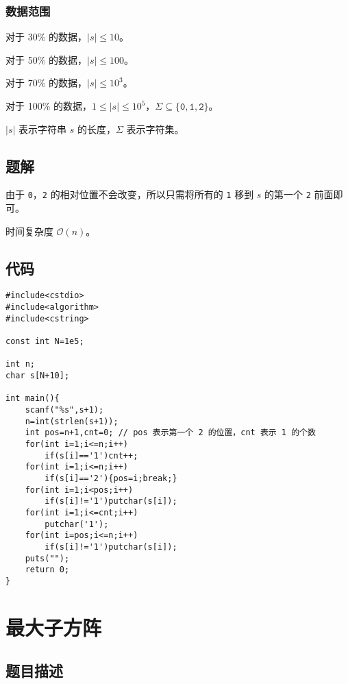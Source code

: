 \documentclass{article}
\begin{document}
	\subsubsection{数据范围}

	对于 30\% 的数据，$|s|\le 10$。

	对于 50\% 的数据，$|s|\le 100$。

	对于 70\% 的数据，$|s|\le 10^{3}$。

	对于 100\% 的数据，$1\le |s|\le 10^{5}$，$\Sigma\subseteq\{\texttt{0},\texttt{1},\texttt{2}\}$。

	$|s|$ 表示字符串 $s$ 的长度，$\Sigma$ 表示字符集。

	\newpage

	\subsection{题解}

	由于 \texttt{0}，\texttt{2} 的相对位置不会改变，所以只需将所有的 \texttt{1} 移到 $s$ 的第一个 \texttt{2} 前面即可。

	时间复杂度 $\mathcal O(n)$。

	\subsection{代码}

	\begin{lstlisting}
#include<cstdio>
#include<algorithm>
#include<cstring>

const int N=1e5;

int n;
char s[N+10];

int main(){
	scanf("%s",s+1);
	n=int(strlen(s+1));
	int pos=n+1,cnt=0; // pos 表示第一个 2 的位置，cnt 表示 1 的个数
	for(int i=1;i<=n;i++)
		if(s[i]=='1')cnt++;
	for(int i=1;i<=n;i++)
		if(s[i]=='2'){pos=i;break;}
	for(int i=1;i<pos;i++)
		if(s[i]!='1')putchar(s[i]);
	for(int i=1;i<=cnt;i++)
		putchar('1');
	for(int i=pos;i<=n;i++)
		if(s[i]!='1')putchar(s[i]);
	puts("");
	return 0;
}
	\end{lstlisting}

	\newpage

	\section{最大子方阵}

	\subsection{题目描述}
\end{document}

